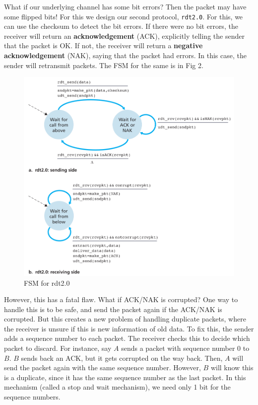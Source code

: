 \documentclass[12pt,letterpaper]{book}
\theoremstyle{definition}
\begin{document}
What if our underlying channel has some bit errors? Then the packet may have some flipped bits! For this we design our second protocol, \texttt{rdt2.0}. For this, we can use the checksum to detect the bit errors. If there were no bit errors, the receiver will return an \textbf{acknowledgement} (ACK), explicitly telling the sender that the packet is OK. If not, the receiver will return a \textbf{negative acknowledgement} (NAK), saying that the packet had errors. In this case, the sender will retransmit packets. The FSM for the same is in Fig 2.

\begin{figure}[htpb]
  \centering
  \includegraphics[width=0.8\linewidth]{./assets/rdt2_fsm.png}
  \caption{FSM for rdt2.0}%
  \label{fig:}
\end{figure}

However, this has a fatal flaw. What if ACK/NAK is corrupted? One way to handle this is to be safe, and send the packet again if the ACK/NAK is corrupted. But this creates a new problem of handling duplicate packets, where the receiver is unsure if this is new information of old data. To fix this, the sender adds a sequence number to each packet. The receiver checks this to decide which packet to discard.  For instance, say $A$ sends a packet with sequence number 0 to $B$. $B$ sends back an ACK, but it gets corrupted on the way back. Then, $A$ will send the packet again with the same sequence number. However, $B$ will know this is a duplicate, since it has the same sequence number as the last packet. In this mechanism (called a stop and wait mechanism), we need only 1 bit for the sequence numbers.
\end{document}
